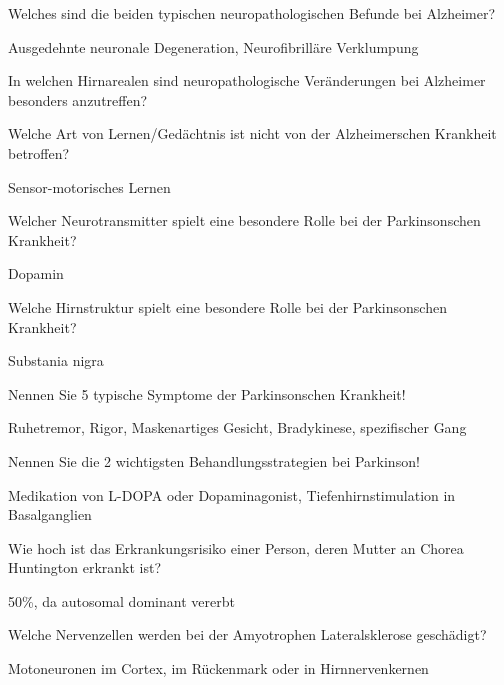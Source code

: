 \documentclass[10pt, a4paper]{exam}
\newcommand\Warning{%
 \makebox[1.4em][c]{%
 \makebox[0pt][c]{\raisebox{.1em}{\small!}}%
 \makebox[0pt][c]{\color{red}\Large$\bigtriangleup$}}}%
\begin{document}
\begin{questions}
  \question Welches sind die beiden typischen neuropathologischen Befunde bei Alzheimer?
  \begin{solution}
    Ausgedehnte neuronale Degeneration, Neurofibrilläre Verklumpung \Warning
  \end{solution}

  \question In welchen Hirnarealen sind neuropathologische Veränderungen bei Alzheimer besonders anzutreffen?
  \begin{solution}

  \end{solution}

  \question Welche Art von Lernen/Gedächtnis ist nicht von der Alzheimerschen Krankheit betroffen?
  \begin{solution}
    Sensor-motorisches Lernen
  \end{solution}

  \question Welcher Neurotransmitter spielt eine besondere Rolle bei der Parkinsonschen Krankheit?
  \begin{solution}
    Dopamin
  \end{solution}

  \question Welche Hirnstruktur spielt eine besondere Rolle bei der Parkinsonschen Krankheit?
  \begin{solution}
    Substania nigra
  \end{solution}

  \question Nennen Sie 5 typische Symptome der Parkinsonschen Krankheit!
  \begin{solution}
    Ruhetremor, Rigor, Maskenartiges Gesicht, Bradykinese, spezifischer Gang
  \end{solution}

  \question Nennen Sie die 2 wichtigsten Behandlungsstrategien bei Parkinson!
  \begin{solution}
    Medikation von L-DOPA oder Dopaminagonist, Tiefenhirnstimulation in Basalganglien
  \end{solution}

  \question Wie hoch ist das Erkrankungsrisiko einer Person, deren Mutter an Chorea Huntington erkrankt ist?
  \begin{solution}
    50\%, da autosomal dominant vererbt
  \end{solution}

  \question Welche Nervenzellen werden bei der Amyotrophen Lateralsklerose geschädigt?
  \begin{solution}
    Motoneuronen im Cortex, im Rückenmark oder in Hirnnervenkernen
  \end{solution}


\end{questions}
\end{document}
